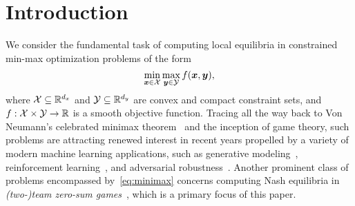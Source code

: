 
\section{Introduction}

We consider the fundamental task of computing local equilibria in constrained min-max optimization problems of the form
\begin{equation}
    \label{eq:minimax}
    \min_{{\bm{x}} \in \mathcal{X}} \max_{{\bm{y}} \in \mathcal{Y}} f({\bm{x}}, {\bm{y}}),
\end{equation}
where $\mathcal{X} \subseteq \mathbb{R}^{d_x}$ and $\mathcal{Y} \subseteq \mathbb{R}^{d_y}$ are convex and compact constraint sets, and $f : \mathcal{X} \times \mathcal{Y} \to \mathbb{R}$ is a smooth objective function. Tracing all the way back to Von Neumann's celebrated minimax theorem~\cite{vonNeumann28:Zur} and the inception of game theory, such problems are attracting renewed interest in recent years propelled by a variety of modern machine learning applications, such as generative modeling~\citep{goodfellow2014generative}, reinforcement learning~\citep{daskalakis2020independent,Bai20:Provable,Wei21:Last}, and adversarial robustness~\citep{Madry17:Towards,cohen19:Certified,Bai21:Recent,Carlini19:Evaluating}. Another prominent class of problems encompassed by~\eqref{eq:minimax} concerns computing Nash equilibria in \emph{(two-)team zero-sum games}~\citep{Zhang23:Team,Zhang21:Computing,Basilico17:Team,Stengel97:Team,Carminati23:Hidden,Orzech23:Correlated,Farina18:Ex,Zhang20:Converging,Celli18:Computational,schulman2017duality}, which is a primary focus of this paper.

